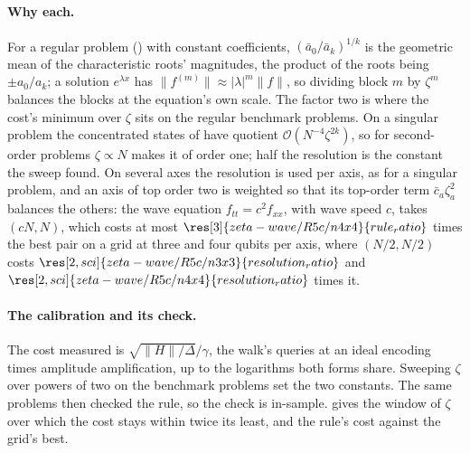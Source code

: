 \paragraph{Why each.} For a regular problem () with constant coefficients, $(\bar a_0/\bar a_k)^{1/k}$ is the geometric mean of the characteristic roots' magnitudes, the product of the roots being $\pm a_0/a_k$; a solution $e^{\lambda x}$ has $\|f^{(m)}\|\approx|\lambda|^m\|f\|$, so dividing block $m$ by $\zeta^m$ balances the blocks at the equation's own scale. The factor two is where the cost's minimum over $\zeta$ sits on the regular benchmark problems. On a singular problem the concentrated states of  have quotient $\mathcal{O}(N^{-4}\zeta^{2k})$, so for second-order problems $\zeta\propto N$ makes it of order one; half the resolution is the constant the sweep found. On several axes the resolution is used per axis, as for a singular problem, and an axis of top order two is weighted so that its top-order term $\bar c_a\zeta_a^2$ balances the others: the wave equation $f_{tt}=c^2f_{xx}$, with wave speed $c$, takes $(cN,N)$, which costs at most $\res[3]{zeta-wave/R5c/n4x4}{rule_ratio}$ times the best pair on a grid at three and four qubits per axis, where $(N/2,N/2)$ costs $\res[2,sci]{zeta-wave/R5c/n3x3}{resolution_ratio}$ and $\res[2,sci]{zeta-wave/R5c/n4x4}{resolution_ratio}$ times it.

\paragraph{The calibration and its check.} The cost measured is $\sqrt{\|H\|/\Delta}/\gamma$, the walk's queries at an ideal encoding times amplitude amplification, up to the logarithms both forms share. Sweeping $\zeta$ over powers of two on the benchmark problems set the two constants. The same problems then checked the rule, so the check is in-sample.  gives the window of $\zeta$ over which the cost stays within twice its least, and  the rule's cost against the grid's best.

